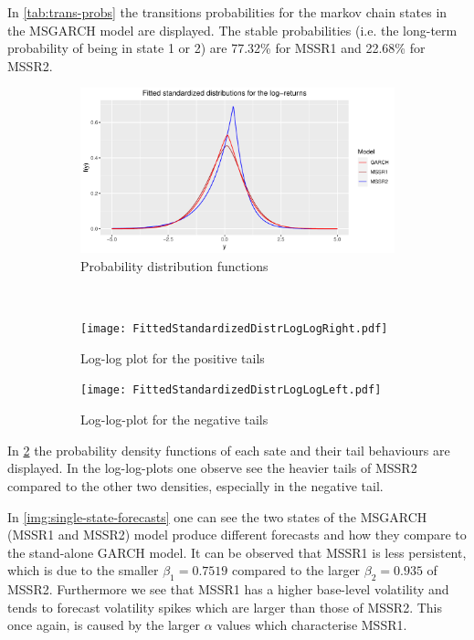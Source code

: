 \documentclass[11pt,a4paper]{article}
\begin{document}
In \cref{tab:trans-probs} the transitions probabilities for the markov chain states in the MSGARCH model are displayed. The stable probabilities (i.e. the long-term probability of being in state 1 or 2) are 77.32\% for MSSR1 and 22.68\% for MSSR2.

\begin{figure}[H]
	\begin{subfigure}{1\textwidth}
	\centering
	\includegraphics[width=0.7\linewidth]{FittedStandardizedDistr.pdf}
	\caption{Probability distribution functions}
	\end{subfigure} \\
	\begin{subfigure}{.5\textwidth}
		\centering
		\texttt{[image: FittedStandardizedDistrLogLogRight.pdf]}
		\caption{Log-log plot for the positive tails}
	\end{subfigure}
	\begin{subfigure}{.5\textwidth}
	\centering
	\texttt{[image: FittedStandardizedDistrLogLogLeft.pdf]}
	\caption{Log-log-plot for the negative tails} \label{fig:distributions-left-tail}
	\end{subfigure}
	\caption{}
	\label{fig:distributions}
\end{figure}

In \cref{fig:distributions} the probability density functions of each sate and their tail behaviours are displayed.
In the log-log-plots one observe see the heavier tails of MSSR2 compared to the other two densities, especially in the negative tail.

In \cref{img:single-state-forecasts} one can see the two states of the MSGARCH (MSSR1 and MSSR2) model produce different forecasts and how they compare to the stand-alone GARCH model. 
It can be observed that MSSR1 is less persistent, which is due to the smaller $\beta_1 = 0.7519$ compared to the larger $\beta_2 = 0.935$ of MSSR2.
Furthermore we see that MSSR1 has a higher base-level volatility and tends to forecast volatility spikes which are larger than those of MSSR2. This once again, is caused by the larger $\alpha$ values which characterise MSSR1.
\end{document}
